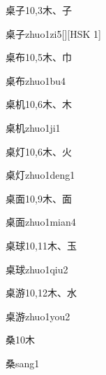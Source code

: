 \begin{entry}{桌子}{10,3}{⽊、⼦}
  \begin{phonetics}{桌子}{zhuo1zi5}[][HSK 1]
  \end{phonetics}
\end{entry}

\begin{entry}{桌布}{10,5}{⽊、⼱}
  \begin{phonetics}{桌布}{zhuo1bu4}
  \end{phonetics}
\end{entry}

\begin{entry}{桌机}{10,6}{⽊、⽊}
  \begin{phonetics}{桌机}{zhuo1ji1}
  \end{phonetics}
\end{entry}

\begin{entry}{桌灯}{10,6}{⽊、⽕}
  \begin{phonetics}{桌灯}{zhuo1deng1}
  \end{phonetics}
\end{entry}

\begin{entry}{桌面}{10,9}{⽊、⾯}
  \begin{phonetics}{桌面}{zhuo1mian4}
  \end{phonetics}
\end{entry}

\begin{entry}{桌球}{10,11}{⽊、⽟}
  \begin{phonetics}{桌球}{zhuo1qiu2}
  \end{phonetics}
\end{entry}

\begin{entry}{桌游}{10,12}{⽊、⽔}
  \begin{phonetics}{桌游}{zhuo1you2}
  \end{phonetics}
\end{entry}

\begin{entry}{桑}{10}{⽊}
  \begin{phonetics}{桑}{sang1}
  \end{phonetics}
\end{entry}


